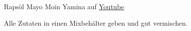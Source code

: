 \begin{recipe}[]{ Rapsöl Mayo }{ Moin Yamina auf \href{https://www.youtube.com/watch?v=I68KLKFsKpM}{Youtube} }{  }



\step
Alle Zutaten in einen Mixbehälter geben und gut vermischen.



\end{recipe}
